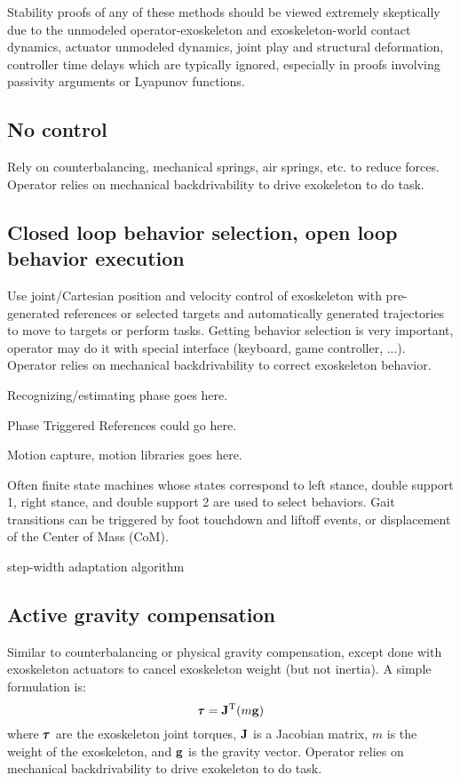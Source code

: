\documentclass[letterpaper,12pt,fullpage]{article}
\begin{document}
Stability proofs of any of these methods should be viewed extremely skeptically due
to the unmodeled operator-exoskeleton and exoskeleton-world contact dynamics, 
actuator unmodeled dynamics, joint play and structural deformation, controller
time delays which are typically ignored, especially in proofs involving
passivity arguments or Lyapunov functions.

\subsection{No control}

Rely on counterbalancing, mechanical springs, air springs, etc.
to reduce forces. 
Operator relies on mechanical backdrivability to drive
exokeleton to do task.

\subsection{Closed loop behavior selection, open loop behavior
execution}

Use joint/Cartesian position and velocity control of exoskeleton 
with pre-generated references or selected targets and automatically generated trajectories to move to targets or perform tasks.
Getting behavior selection is very important, operator may do it with
special interface (keyboard, game controller, ...).
Operator relies on mechanical backdrivability to correct exoskeleton behavior.

Recognizing/estimating phase goes here.

Phase Triggered References could go here.

Motion capture, motion libraries goes here.

Often finite state machines whose states correspond to left stance, double support 1,
right stance, and double support 2 are used to select behaviors. Gait transitions
can be triggered by foot touchdown and liftoff events, or
displacement of the Center of Mass (CoM).

step-width adaptation algorithm

\subsection{Active gravity compensation}

Similar to counterbalancing or physical gravity compensation, except done
with exoskeleton actuators to cancel exoskeleton weight (but not inertia).
A simple formulation is:
\begin{equation}
\vtau = \mJ^{\tr} (m\vg)
\end{equation}
where $\vtau$ are the exoskeleton joint torques, 
${\bf J}$ is a Jacobian matrix, $m$ is the weight of the exoskeleton,
and ${\bf g}$ is the gravity vector. 
Operator relies on mechanical backdrivability to drive
exokeleton to do task.
\end{document}
